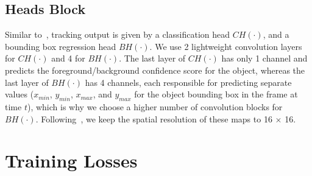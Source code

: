 \subsection{Heads Block}
Similar to~\cite{zhang2020ocean, borsuk2022fear}, tracking output is given by a classification head $CH(\cdot)$, and a bounding box regression head $BH(\cdot)$.
We use 2 lightweight convolution layers for $CH(\cdot)$ and 4 for $BH(\cdot)$.
The last layer of $CH(\cdot)$ has only 1 channel and predicts the foreground/background confidence score for the object, whereas the last layer of $BH(\cdot)$ has 4 channels, each responsible for predicting separate values ($x_{min}$, $y_{min}$, $x_{max}$, and $y_{max}$ for the object bounding box in the frame at time $t$), which is why we choose a higher number of convolution blocks for $BH(\cdot)$. Following~\cite{borsuk2022fear}, we keep the spatial resolution of these maps to 16 $\times$ 16. 

\begin{table}
\caption{Comparison of FLOPs, number of parameters, and latency when using MobileViTv3\cite{wadekar2022mobilevitv3}, Polarized Self-Attention\cite{liu2021polarized} and Fast Mixed Filtration, with their performances on AVisT \cite{noman2022avist} and LaSOT \cite{fan2021lasot}.}
  \label{tab:att_comp}
  \centering
\end{table}

\section{Training Losses}


